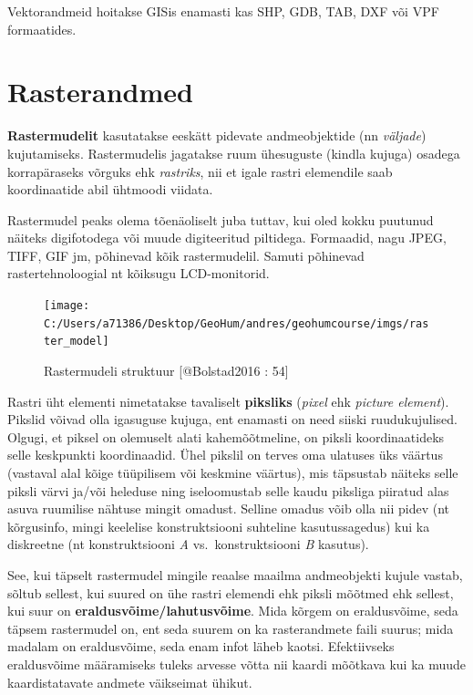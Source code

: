 \documentclass[
]{book}
\begin{document}
Vektorandmeid hoitakse GISis enamasti kas SHP, GDB, TAB, DXF või VPF formaatides.

\hypertarget{rasterandmed}{%
\section{Rasterandmed}\label{rasterandmed}}

\textbf{Rastermudelit} kasutatakse eeskätt pidevate andmeobjektide (nn \emph{väljade}) kujutamiseks. Rastermudelis jagatakse ruum ühesuguste (kindla kujuga) osadega korrapäraseks võrguks ehk \emph{rastriks}, nii et igale rastri elemendile saab koordinaatide abil ühtmoodi viidata.

Rastermudel peaks olema tõenäoliselt juba tuttav, kui oled kokku puutunud näiteks digifotodega või muude digiteeritud piltidega. Formaadid, nagu JPEG, TIFF, GIF jm, põhinevad kõik rastermudelil. Samuti põhinevad rastertehnoloogial nt kõiksugu LCD-monitorid.

\begin{figure}

{\centering \texttt{[image: C:/Users/a71386/Desktop/GeoHum/andres/geohumcourse/imgs/raster\_model]} 

}

\caption{Rastermudeli struktuur [@Bolstad2016 : 54]}\label{fig:raster}
\end{figure}

Rastri üht elementi nimetatakse tavaliselt \textbf{piksliks} (\emph{pixel} ehk \emph{picture element}). Pikslid võivad olla igasuguse kujuga, ent enamasti on need siiski ruudukujulised. Olgugi, et piksel on olemuselt alati kahemõõtmeline, on piksli koordinaatideks selle keskpunkti koordinaadid. Ühel pikslil on terves oma ulatuses üks väärtus (vastaval alal kõige tüüpilisem või keskmine väärtus), mis täpsustab näiteks selle piksli värvi ja/või heleduse ning iseloomustab selle kaudu piksliga piiratud alas asuva ruumilise nähtuse mingit omadust. Selline omadus võib olla nii pidev (nt kõrgusinfo, mingi keelelise konstruktsiooni suhteline kasutussagedus) kui ka diskreetne (nt konstruktsiooni \emph{A} vs.~konstruktsiooni \emph{B} kasutus).

See, kui täpselt rastermudel mingile reaalse maailma andmeobjekti kujule vastab, sõltub sellest, kui suured on ühe rastri elemendi ehk piksli mõõtmed ehk sellest, kui suur on \textbf{eraldusvõime/lahutusvõime}. Mida kõrgem on eraldusvõime, seda täpsem rastermudel on, ent seda suurem on ka rasterandmete faili suurus; mida madalam on eraldusvõime, seda enam infot läheb kaotsi. Efektiivseks eraldusvõime määramiseks tuleks arvesse võtta nii kaardi mõõtkava kui ka muude kaardistatavate andmete väikseimat ühikut.
\end{document}
